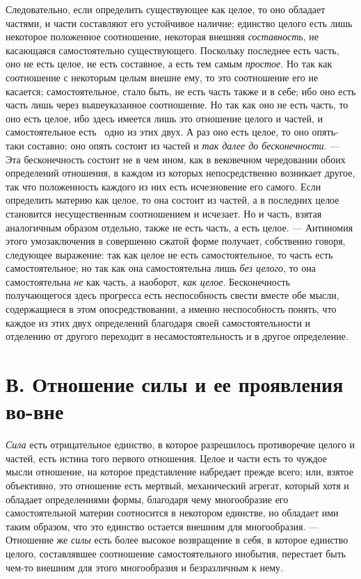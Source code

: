 Следовательно, если определить существующее как целое, то оно обладает
частями, и части составляют его устойчивое наличие; единство целого есть
лишь некоторое положенное соотношение, некоторая внешняя
{\em составность}, не касающаяся самостоятельно
существующего. Поскольку последнее есть часть, оно не есть целое, не есть
составное, а есть тем самым {\em простое}. Но так как
соотношение с некоторым целым внешне ему, то это соотношение его не
касается; самостоятельное, стало быть, не есть часть также и в себе; ибо
оно есть часть лишь через вышеуказанное соотношение. Но так как оно не есть
часть, то оно есть целое, ибо здесь имеется лишь это отношение целого и
частей, и самостоятельное есть \ одно из этих двух. А раз оно есть целое,
то оно опять-таки составно; оно опять состоит из частей и
{\em так далее до бесконечности}. — Эта бесконечность
состоит не в чем ином, как в вековечном чередовании обоих определений
отношения, в каждом из которых непосредственно возникает другое, так что
положенность каждого из них есть исчезновение его самого. Если определить
материю как целое, то она состоит из частей, а в последних целое становится
несущественным соотношением и исчезает. Но и часть, взятая аналогичным
образом отдельно, также не есть часть, а есть целое. — Антиномия этого
умозаключения в совершенно сжатой форме получает, собственно говоря,
следующее выражение: так как целое не есть самостоятельное, то часть есть
самостоятельное; но так как она самостоятельна лишь
{\em без целого}, то она самостоятельна
{\em не} как часть, а наоборот,
{\em как целое}. Бесконечность получающегося здесь
прогресса есть неспособность свести вместе обе мысли, содержащиеся в этом
опосредствовании, а именно неспособность понять, что каждое из этих двух
определений благодаря своей самостоятельности и отделению от другого
переходит в несамостоятельность и в другое определение.


\section[В. Отношение силы и ее проявления во-вне]
{В. Отношение силы и ее проявления во-вне}

{\em Сила} есть
отрицательное единство, в которое разрешилось противоречие целого и частей,
есть истина того первого отношения. Целое и части есть то чуждое мысли
отношение, на которое представление набредает прежде всего; или, взятое
объективно, это отношение есть мертвый, механический агрегат, который хотя
и обладает определениями формы, благодаря чему многообразие его
самостоятельной материи соотносится в некотором единстве, но обладает ими
таким образом, что это единство остается внешним для многообразия. —
Отношение же {\em силы} есть более высокое возвращение
в себя, в которое единство целого, составлявшее соотношение
самостоятельного инобытия, перестает быть чем-то внешним для этого
многообразия и безразличным к нему.

